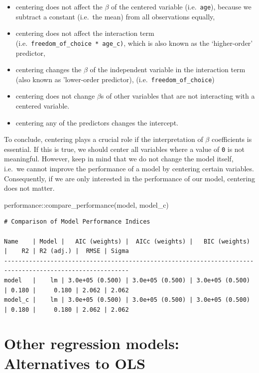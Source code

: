 \documentclass[
  letterpaper,
]{krantz}
\makeatletter
\newenvironment{Shaded}{\begin{snugshade}}{\end{snugshade}}
\newcommand{\FunctionTok}[1]{\textcolor[rgb]{0.28,0.35,0.67}{#1}}
\newcommand{\NormalTok}[1]{\textcolor[rgb]{0.00,0.23,0.31}{#1}}
\newcommand{\SpecialCharTok}[1]{\textcolor[rgb]{0.37,0.37,0.37}{#1}}
\newenvironment{kframe}{%
\medskip{}
\setlength{\fboxsep}{.8em}
 \def\at@end@of@kframe{}%
 \ifinner\ifhmode%
  \def\at@end@of@kframe{\end{minipage}}%
  \begin{minipage}{\columnwidth}%
 \fi\fi%
 \def\FrameCommand##1{\hskip\@totalleftmargin \hskip-\fboxsep
 \colorbox{shadecolor}{##1}\hskip-\fboxsep
     \hskip-\linewidth \hskip-\@totalleftmargin \hskip\columnwidth}%
 \MakeFramed {\advance\hsize-\width
   \@totalleftmargin\z@ \linewidth\hsize
   \@setminipage}}%
 {\par\unskip\endMakeFramed%
 \at@end@of@kframe}
\renewenvironment{Shaded}{\begin{kframe}}{\end{kframe}}
\makeatother
\begin{document}
\begin{itemize}
\item
  centering does not affect the \(\beta\) of the centered variable
  (i.e.~\texttt{age}), because we subtract a constant (i.e.~the mean)
  from all observations equally,
\item
  centering does not affect the interaction term
  (i.e.~\texttt{freedom\_of\_choice\ *\ age\_c)}, which is also known as
  the `higher-order' predictor,
\item
  centering changes the \(\beta\) of the independent variable in the
  interaction term (also known as 'lower-order predictor),
  (i.e.~\texttt{freedom\_of\_choice})
\item
  centering does not change \(\beta\)s of other variables that are not
  interacting with a centered variable.
\item
  centering any of the predictors changes the intercept.
\end{itemize}

To conclude, centering plays a crucial role if the interpretation of
\(\beta\) coefficients is essential. If this is true, we should center
all variables where a value of \texttt{0} is not meaningful. However,
keep in mind that we do not change the model itself, i.e.~we cannot
improve the performance of a model by centering certain variables.
Consequently, if we are only interested in the performance of our model,
centering does not matter.

\begin{Shaded}
\begin{Highlighting}[]
\NormalTok{performance}\SpecialCharTok{::}\FunctionTok{compare\_performance}\NormalTok{(model, model\_c)}
\end{Highlighting}
\end{Shaded}

\begin{verbatim}
# Comparison of Model Performance Indices

Name    | Model |   AIC (weights) |  AICc (weights) |   BIC (weights) |    R2 | R2 (adj.) |  RMSE | Sigma
---------------------------------------------------------------------------------------------------------
model   |    lm | 3.0e+05 (0.500) | 3.0e+05 (0.500) | 3.0e+05 (0.500) | 0.180 |     0.180 | 2.062 | 2.062
model_c |    lm | 3.0e+05 (0.500) | 3.0e+05 (0.500) | 3.0e+05 (0.500) | 0.180 |     0.180 | 2.062 | 2.062
\end{verbatim}

\section{Other regression models: Alternatives to
OLS}\label{sec-ols-alternatives}
\end{document}
